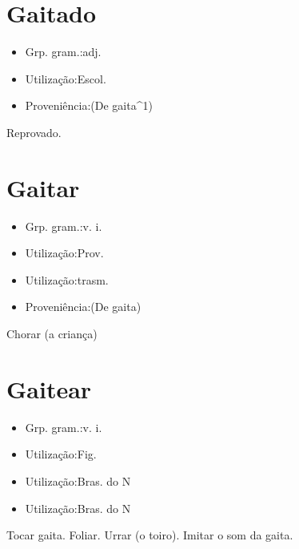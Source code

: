 \section{Gaitado}
\begin{itemize}
\item {Grp. gram.:adj.}
\end{itemize}
\begin{itemize}
\item {Utilização:Escol.}
\end{itemize}
\begin{itemize}
\item {Proveniência:(De \textunderscore gaita\textunderscore ^1)}
\end{itemize}
Reprovado.
\section{Gaitar}
\begin{itemize}
\item {Grp. gram.:v. i.}
\end{itemize}
\begin{itemize}
\item {Utilização:Prov.}
\end{itemize}
\begin{itemize}
\item {Utilização:trasm.}
\end{itemize}
\begin{itemize}
\item {Proveniência:(De \textunderscore gaita\textunderscore )}
\end{itemize}
Chorar (a criança)
\section{Gaitear}
\begin{itemize}
\item {Grp. gram.:v. i.}
\end{itemize}
\begin{itemize}
\item {Utilização:Fig.}
\end{itemize}
\begin{itemize}
\item {Utilização:Bras. do N}
\end{itemize}
\begin{itemize}
\item {Utilização:Bras. do N}
\end{itemize}
Tocar gaita.
Foliar.
Urrar (o toiro).
Imitar o som da gaita.
